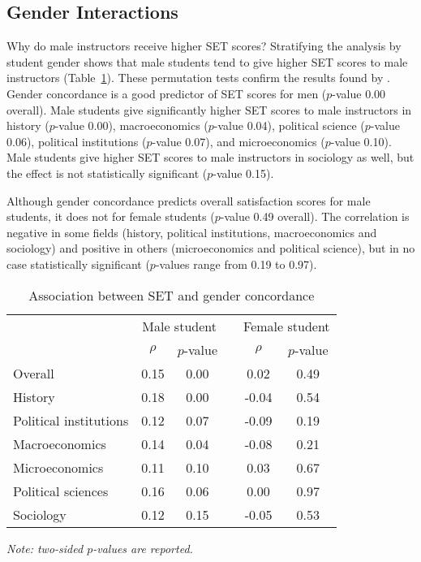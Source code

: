 \documentclass[12pt]{article}
\begin{document}
\subsection{Gender Interactions}
Why do male instructors receive higher SET scores? 
Stratifying the analysis by student gender shows that
male students tend to give higher SET scores to male instructors (Table~\ref{tab:genderconcordance}). 
These permutation tests confirm the results found by \citet{Boring2015}. 
Gender concordance is a good predictor of SET scores for men ($p$-value 0.00 overall). 
Male students give significantly higher SET scores to male instructors in  
history ($p$-value 0.00), macroeconomics ($p$-value 0.04), political science ($p$-value 0.06), political institutions ($p$-value 0.07), and microeconomics ($p$-value 0.10). 
Male students give higher SET scores to male instructors in sociology as well, but the
effect is not statistically significant ($p$-value 0.15). 

Although gender concordance predicts overall satisfaction scores for male students, 
it does not for female students ($p$-value 0.49 overall). 
The correlation is negative in some fields (history, political institutions, macroeconomics and sociology) and positive in others (microeconomics and political science), but in no case statistically significant ($p$-values range from 0.19 to 0.97).



\begin{table}[htbp]
  \centering
  \footnotesize 
  \caption{Association between SET and gender concordance}
    \begin{tabular}{lccccc}
    \toprule 
          & \multicolumn{2}{c}{Male student}  &  & \multicolumn{2}{c}{Female student} \\
      & $\rho$  &  $p$-value &  & $\rho$  &  $p$-value    \\
   \midrule
      \quad  Overall &                 0.15       & 0.00 & &  0.02       & 0.49      \\
      \quad  History &                 0.18       & 0.00 & & -0.04       & 0.54      \\
      \quad  Political institutions &  0.12       & 0.07 & & -0.09       & 0.19       \\
      \quad  Macroeconomics &          0.14       & 0.04 & & -0.08       & 0.21     \\
      \quad  Microeconomics &          0.11       & 0.10 & &  0.03       & 0.67       \\
      \quad  Political sciences &      0.16       & 0.06 & &  0.00       & 0.97      \\
      \quad  Sociology &               0.12       & 0.15 & & -0.05       & 0.53      \\
    \bottomrule
    \end{tabular}%
 \label{tab:genderconcordance}%
  
  \textit{Note: two-sided $p$-values are reported.}
\end{table}%
\normalsize
\end{document}
